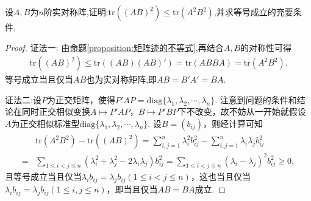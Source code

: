 \documentclass[../../main.tex]{subfiles}%
\begin{document}
\begin{example}
设\(A,B\)为\(n\)阶实对称阵,证明:\(\text{tr}((AB)^2)\leqslant \text{tr}(A^2B^2)\),并求等号成立的充要条件.
\end{example}
\begin{proof}

{\color{blue}证法一:}
由\hyperref[proposition:矩阵迹的不等式]{命题\ref{proposition:矩阵迹的不等式}},再结合$A,B$的对称性可得
\begin{align*}
\mathrm{tr}\left( \left( AB \right) ^2 \right) \leqslant \mathrm{tr}\left( \left( AB \right) \left( AB \right) ' \right) =\mathrm{tr}\left( ABBA \right) =\mathrm{tr}\left( A^2B^2 \right) .
\end{align*}
等号成立当且仅当$AB$也为实对称矩阵,即\(AB = B'A'=BA\).

{\color{blue}证法二:}设\(P\)为正交矩阵，使得\(P'AP = \mathrm{diag}\{\lambda_1,\lambda_2,\cdots,\lambda_n\}\). 注意到问题的条件和结论在同时正交相似变换\(A\mapsto P'AP\)，\(B\mapsto P'BP\)下不改变，故不妨从一开始就假设\(A\)为正交相似标准型\(\mathrm{diag}\{\lambda_1,\lambda_2,\cdots,\lambda_n\}\). 设\(B=(b_{ij})\)，则经计算可知
\begin{align*}
&\mathrm{tr}(A^2B^2)-\mathrm{tr}((AB)^2)=\sum_{i,j = 1}^{n}\lambda_i^2b_{ij}^2-\sum_{i,j = 1}^{n}\lambda_i\lambda_jb_{ij}^2\\
=&\sum_{1\leqslant  i<j\leqslant  n}(\lambda_i^2+\lambda_j^2 - 2\lambda_i\lambda_j)b_{ij}^2=\sum_{1\leqslant  i<j\leqslant  n}(\lambda_i - \lambda_j)^2b_{ij}^2\geqslant 0,
\end{align*}
且等号成立当且仅当\(\lambda_ib_{ij}=\lambda_jb_{ij}(1\leqslant  i<j\leqslant  n)\)，这也当且仅当\(\lambda_ib_{ij}=\lambda_jb_{ij}(1\leqslant  i,j\leqslant  n)\)，即当且仅当\(AB = BA\)成立. 
\end{proof}
\end{document}
